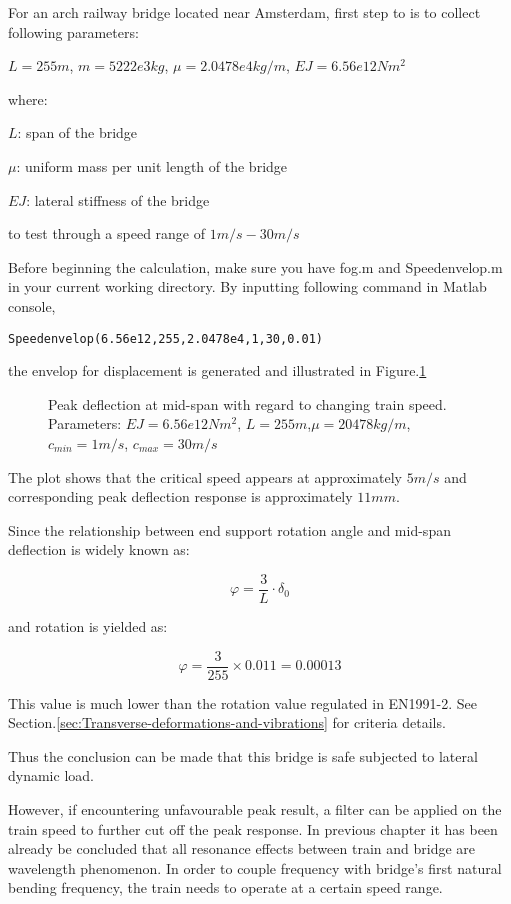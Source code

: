 For an arch railway bridge located near Amsterdam, first step to is to collect following parameters:

$L = 255m$, $m = 5222e3kg$, $\mu = 2.0478e4 kg/m$, $EJ = 6.56e12Nm^2$

where:

$L$: span of the bridge

$\mu$: uniform mass per unit length of the bridge

$EJ$: lateral stiffness of the bridge

to test through a speed range of $1m/s - 30m/s$

Before beginning the calculation, make sure you have fog.m and Speedenvelop.m in your current working directory. By inputting following command in Matlab console, 

\texttt{Speedenvelop(6.56e12,255,2.0478e4,1,30,0.01)}


the envelop for displacement is generated and illustrated in Figure.\ref{fig:spedefEJ6560000000000L255min1max30mu20478.tikz}

\begin{figure}[h!]
\centering 
\setlength\figureheight{6cm} 
\setlength\figurewidth{6cm} 
 
\caption{Peak deflection at mid-span with regard to changing train speed. Parameters: $EJ = 6.56e12Nm^2$, $L= 255m$,$\mu = 20478 kg/m$, $c_{min}=1m/s$, $c_{max} = 30m/s$} 
\label{fig:spedefEJ6560000000000L255min1max30mu20478.tikz} 
\end{figure}

The plot shows that the critical speed appears at approximately $5m/s$ and corresponding peak deflection response is approximately $11mm$. 

Since the relationship between end support rotation angle and mid-span deflection is widely known as:

$$ \varphi = \frac{3}{L}\cdot \delta_0  $$

and rotation is yielded as:

$$ \varphi = \frac{3}{255}\times 0.011 = 0.00013 $$

This value is much lower than the rotation value regulated in EN1991-2. See Section.\ref{sec:Transverse-deformations-and-vibrations} for criteria details.

Thus the conclusion can be made that this bridge is safe subjected to lateral dynamic load.

However, if encountering unfavourable peak result, a filter can be applied on the train speed to further cut off the peak response. In previous chapter it has been already be concluded that all resonance effects between train and bridge are wavelength phenomenon. In order to couple frequency with bridge's first natural bending frequency, the train needs to operate at a certain speed range. 

